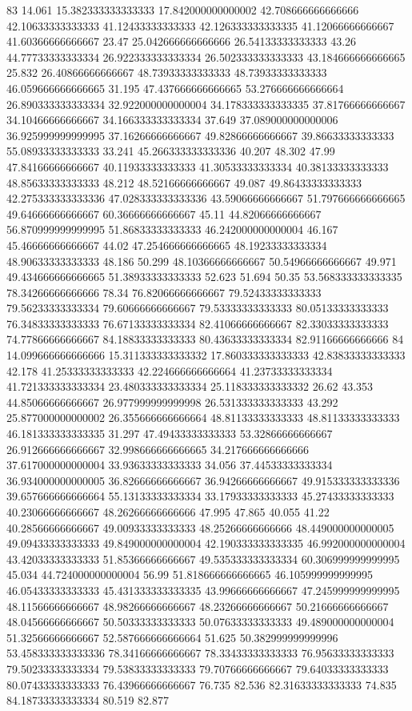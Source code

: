 83 14.061 15.382333333333333 17.842000000000002 42.708666666666666 42.10633333333333 41.12433333333333 42.126333333333335 41.12066666666667 41.60366666666667 23.47 25.042666666666666 26.54133333333333 43.26 44.77733333333334 26.922333333333334 26.502333333333333 43.184666666666665 25.832 26.40866666666667 48.73933333333333 48.73933333333333 46.059666666666665 31.195 47.437666666666665 53.276666666666664 26.890333333333334 32.922000000000004 34.178333333333335 37.81766666666667 34.10466666666667 34.166333333333334 37.649 37.089000000000006 36.925999999999995 37.16266666666667 49.82866666666667 39.86633333333333 55.08933333333333 33.241 45.266333333333336 40.207 48.302 47.99 47.84166666666667 40.11933333333333 41.30533333333334 40.38133333333333 48.85633333333333 48.212 48.52166666666667 49.087 49.86433333333333 42.275333333333336 47.028333333333336 43.59066666666667 51.797666666666665 49.64666666666667 60.36666666666667 45.11 44.82066666666667 56.870999999999995 51.86833333333333 46.242000000000004 46.167 45.46666666666667 44.02 47.254666666666665 48.19233333333334 48.90633333333333 48.186 50.299 48.10366666666667 50.54966666666667 49.971 49.434666666666665 51.38933333333333 52.623 51.694 50.35 53.568333333333335 78.34266666666666 78.34 76.82066666666667 79.52433333333333 79.56233333333334 79.60666666666667 79.53333333333333 80.05133333333333 76.34833333333333 76.67133333333334 82.41066666666667 82.33033333333333 74.77866666666667 84.18833333333333 80.43633333333334 82.91166666666666
84 14.099666666666666 15.311333333333332 17.860333333333333 42.83833333333333 42.178 41.25333333333333 42.224666666666664 41.23733333333334 41.721333333333334 23.480333333333334 25.118333333333332 26.62 43.353 44.85066666666667 26.977999999999998 26.531333333333333 43.292 25.877000000000002 26.355666666666664 48.81133333333333 48.81133333333333 46.181333333333335 31.297 47.49433333333333 53.32866666666667 26.912666666666667 32.998666666666665 34.217666666666666 37.617000000000004 33.93633333333333 34.056 37.44533333333334 36.934000000000005 36.82666666666667 36.94266666666667 49.915333333333336 39.657666666666664 55.13133333333334 33.17933333333333 45.27433333333333 40.23066666666667 48.26266666666666 47.995 47.865 40.055 41.22 40.28566666666667 49.00933333333333 48.25266666666666 48.449000000000005 49.09433333333333 49.849000000000004 42.190333333333335 46.992000000000004 43.42033333333333 51.85366666666667 49.535333333333334 60.306999999999995 45.034 44.724000000000004 56.99 51.818666666666665 46.105999999999995 46.05433333333333 45.431333333333335 43.99666666666667 47.245999999999995 48.11566666666667 48.98266666666667 48.23266666666667 50.21666666666667 48.04566666666667 50.50333333333333 50.07633333333333 49.489000000000004 51.32566666666667 52.587666666666664 51.625 50.382999999999996 53.458333333333336 78.34166666666667 78.33433333333333 76.95633333333333 79.50233333333334 79.53833333333333 79.70766666666667 79.64033333333333 80.07433333333333 76.43966666666667 76.735 82.536 82.31633333333333 74.835 84.18733333333334 80.519 82.877
